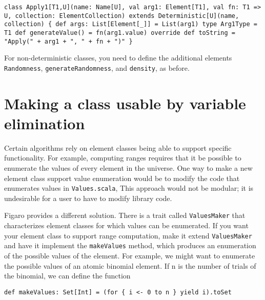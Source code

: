 \begin{flushleft}
\texttt{class Apply1[T1,U](name: Name[U], val arg1: Element[T1], val fn: T1
=> U, collection: ElementCollection)
\newline extends Deterministic[U](name, collection) \{
\newline \tab def args: List[Element[\_]] = List(arg1)
\newline 
\newline \tab type Arg1Type = T1
\newline 
\newline \tab def generateValue() = fn(arg1.value)
\newline 
\newline \tab override def toString = "Apply(" + arg1 + ", " + fn + ")"
\newline \}
}
\end{flushleft}

For non-deterministic classes, you need to define the additional elements \texttt{Randomness}, \texttt{generateRandomness}, and \texttt{density}, as before.

\section{Making a class usable by variable elimination}

Certain algorithms rely on element classes being able to support specific functionality. For example, computing ranges requires that it be possible to enumerate the values of every element in the universe. One way to make a new element class support value enumeration would be to modify the code that enumerates values in \texttt{Values.scala}, This approach would not be modular; it is undesirable for a user to have to modify library code.

Figaro provides a different solution. There is a trait called \texttt{ValuesMa\-ker} that characterizes element classes for which values can be enumerated. If you want your element class to support range computation, make it extend \texttt{ValuesMaker} and have it implement the \texttt{makeValues} method, which produces an enumeration of the possible values of the element. For example, we might want to enumerate the possible values of an atomic binomial element. If n is the number of trials of the binomial, we can define the function

\begin{flushleft}
\texttt{def makeValues: Set[Int] = (for \{ i <- 0 to n \} yield i).toSet}
\end{flushleft}

